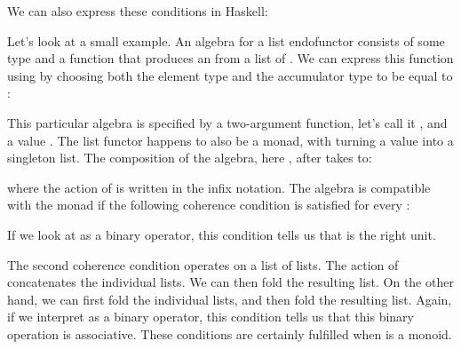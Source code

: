\begin{figure}[H]
  \centering
  \begin{subfigure}
    \centering
  \end{subfigure}
  \hspace{1cm}
  \begin{subfigure}
    \centering
  \end{subfigure}
\end{figure}

\noindent
We can also express these conditions in Haskell:

Let's look at a small example. An algebra for a list endofunctor
consists of some type  and a function that produces an
 from a list of . We can express this function using
 by choosing both the element type and the accumulator
type to be equal to :

This particular algebra is specified by a two-argument function, let's
call it , and a value . The list functor happens to
also be a monad, with  turning a value into a singleton
list. The composition of the algebra, here , after
 takes  to:

where the action of  is written in the infix notation. The
algebra is compatible with the monad if the following coherence
condition is satisfied for every :

If we look at  as a binary operator, this condition tells us
that  is the right unit.

The second coherence condition operates on a list of lists. The action
of  concatenates the individual lists. We can then fold the
resulting list. On the other hand, we can first fold the individual
lists, and then fold the resulting list. Again, if we interpret
 as a binary operator, this condition tells us that this
binary operation is associative. These conditions are certainly
fulfilled when  is a monoid.

